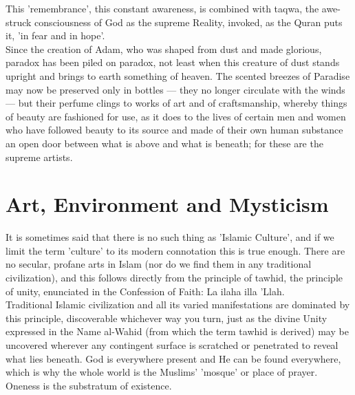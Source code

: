 \documentclass[11pt, b5paper, twoside]{book}
\begin{document}
This 'remembrance', this constant awareness, is combined with taqwa, the awe-struck consciousness of 
God as the supreme Reality, invoked, as the Quran puts it, 'in fear and in hope'. \\

Since the creation of Adam, who was shaped from dust and made glorious, paradox has been piled on 
paradox, not least when this creature of dust stands upright and brings to earth something of heaven. 
The scented breezes of Paradise may now be preserved only in bottles --- they no longer circulate with 
the winds --- but their perfume clings to works of art and of craftsmanship, whereby things of beauty 
are fashioned for use, as it does to the lives of certain men and women who have followed beauty to 
its source and made of their own human substance an open door between what is above and what is 
beneath; for these are the supreme artists. \\


\chapter{Art, Environment and Mysticism}

It is sometimes said that there is no such thing as 'Islamic Culture', and if we limit the term 
'culture' to its modern connotation this is true enough. There are no secular, profane arts in Islam 
(nor do we find them in any traditional civilization), and this follows directly from the principle 
of tawhid, the principle of unity, enunciated in the Confession of Faith: La ilaha illa 'Llah. \\

Traditional Islamic civilization and all its varied manifestations are dominated by this principle, 
discoverable whichever way you turn, just as the divine Unity expressed in the Name al-Wahid (from 
which the term tawhid is derived) may be uncovered wherever any contingent surface is scratched or 
penetrated to reveal what lies beneath. God is everywhere present and He can be found everywhere, 
which is why the whole world is the Muslims' 'mosque' or place of prayer. Oneness is the substratum 
of existence. \\
\end{document}
